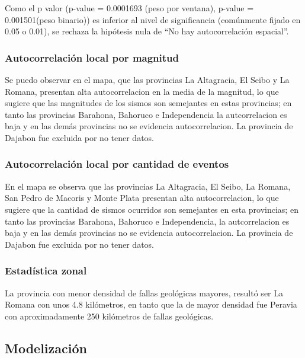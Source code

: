 \documentclass[11pt,]{article}
\begin{document}
Como el p valor (p-value = 0.0001693 (peso por ventana), p-value =
0.001501(peso binario)) es inferior al nivel de significancia
(comúnmente fijado en 0.05 o 0.01), se rechaza la hipótesis nula de ``No
hay autocorrelación espacial''.

\subsubsection{Autocorrelación local por
magnitud}\label{autocorrelaciuxf3n-local-por-magnitud}

Se puedo observar en el mapa, que las provincias La Altagracia, El Seibo
y La Romana, presentan alta autocorrelacion en la media de la magnitud,
lo que sugiere que las magnitudes de los sismos son semejantes en estas
provincias; en tanto las provincias Barahona, Bahoruco e Independencia
la autcorrelacion es baja y en las demás provincias no se evidencia
autocorrelacion. La provincia de Dajabon fue excluida por no tener
datos.

\subsubsection{Autocorrelación local por cantidad de
eventos}\label{autocorrelaciuxf3n-local-por-cantidad-de-eventos}

En el mapa se observa que las provincias La Altagracia, El Seibo, La
Romana, San Pedro de Macoris y Monte Plata presentan alta
autocorrelacion, lo que sugiere que la cantidad de sismos ocurridos son
semejantes en esta provincias; en tanto las provincias Barahona,
Bahoruco e Independencia, la autcorrelacion es baja y en las demás
provincias no se evidencia autocorrelacion. La provincia de Dajabon fue
excluida por no tener datos.

\subsubsection{Estadística zonal}\label{estaduxedstica-zonal}

La provincia con menor densidad de fallas geológicas mayores, resultó
ser La Romana con unos 4.8 kilómetros, en tanto que la de mayor densidad
fue Peravia con aproximadamente 250 kilómetros de fallas geológicas.

\subsection{Modelización}\label{modelizaciuxf3n}
\end{document}
